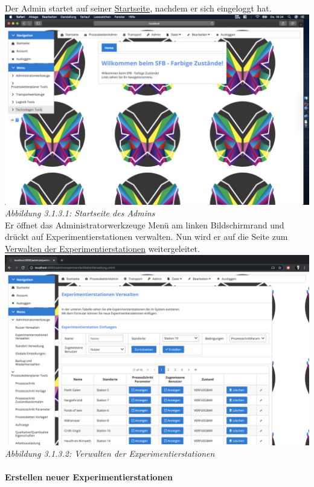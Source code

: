 \documentclass[enabledeprecatedfontcommands,fontsize=12pt,paper=a4,twoside]{scrartcl}
\begin{document}
Der Admin startet auf seiner \hyperlink{sc3.1.3.1}{Startseite}, nachdem er sich eingeloggt hat. \\

\hypertarget{sc3.1.3.1}{
\includegraphics[width=1\textwidth]{Screenshots/311AdminView.png}
\textit{Abbildung 3.1.3.1: Startseite des Admins}
} \\

Er öffnet das Administratorwerkzeuge Menü am linken Bildschirmrand und drückt auf Experimentierstationen verwalten. Nun wird er auf die Seite zum \hyperlink{sc3.1.3.2}{Verwalten der Experimentierstationen} weitergeleitet. \\

\hypertarget{sc3.1.3.2}{
\includegraphics[width=1\textwidth]{Screenshots/3132.png}
\textit{Abbildung 3.1.3.2: Verwalten der Experimentierstationen}
} \\

\paragraph{Erstellen neuer Experimentierstationen}
\end{document}

